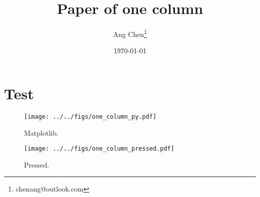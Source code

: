 \documentclass[a4paper,11pt]{article}
\begin{document}
\title{\Large\textbf{Paper of one column}}
\author{Ang Chen\thanks{chenang@outlook.com}} %
\date{\today} %


\maketitle

\section{Test}

\lipsum[1-2]

\begin{figure}[h]
\centering
\texttt{[image: ../../figs/one\_column\_py.pdf]} \\
\caption{\label{fig:from_python} Matplotlib.}
\end{figure}

\lipsum[3]

\begin{figure}[h]
\centering
\texttt{[image: ../../figs/one\_column\_pressed.pdf]} \\
\caption{\label{fig:pressed} Pressed.}
\end{figure}

\lipsum[4]
\end{document}
